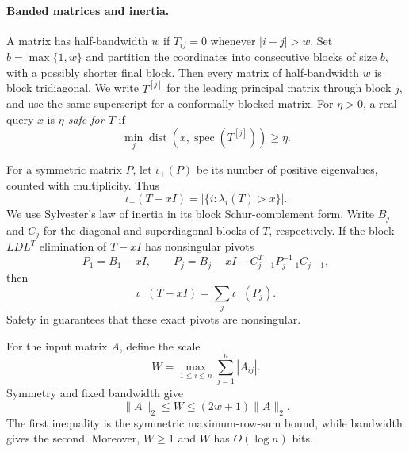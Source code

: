 \documentclass[11pt]{article}
\begin{document}
\paragraph{Banded matrices and inertia.}
A matrix has half-bandwidth $w$ if $T_{ij}=0$ whenever $|i-j|>w$.
Set $b=\max\{1,w\}$ and partition the coordinates into consecutive blocks of
size $b$, with a possibly shorter final block.  Then every matrix of
half-bandwidth $w$ is block tridiagonal.  We write $T^{[j]}$ for the leading
principal matrix through block $j$, and use the same superscript for a
conformally blocked matrix.  For $\eta>0$, a real query $x$ is
\emph{$\eta$-safe for $T$} if
\begin{equation}
 \label{eq:safe-query}
 \min_j\operatorname{dist}(x,\operatorname{spec}(T^{[j]}))\geq\eta.
\end{equation}

For a symmetric matrix $P$, let $\iota_+(P)$ be its number of positive
eigenvalues, counted with multiplicity.  Thus
\begin{equation}
 \label{eq:inertia-count}
 \iota_+(T-xI)=|\{i:\lambda_i(T)>x\}|.
\end{equation}
We use Sylvester's law of inertia in its block Schur-complement form.  Write
$B_j$ and $C_j$ for the diagonal and superdiagonal blocks of $T$,
respectively.  If the block $LDL^T$ elimination of $T-xI$ has nonsingular
pivots
\begin{equation}
 \label{eq:exact-block-pivots}
 P_1=B_1-xI,
 \qquad
 P_j=B_j-xI-C_{j-1}^TP_{j-1}^{-1}C_{j-1},
\end{equation}
then
\begin{equation}
 \label{eq:block-inertia}
 \iota_+(T-xI)=\sum_j\iota_+(P_j).
\end{equation}
Safety in  guarantees that these exact pivots are
nonsingular.

For the input matrix $A$, define the scale
\[
 W=\max_{1\leq i\leq n}\sum_{j=1}^{n}|A_{ij}|.
\]
Symmetry and fixed bandwidth give
\begin{equation}
 \label{eq:W-comparison}
 \lVert A\rVert_2\leq W\leq(2w+1)\lVert A\rVert_2.
\end{equation}
The first inequality is the symmetric maximum-row-sum bound, while bandwidth
gives the second.  Moreover, $W\geq1$ and $W$ has $O(\log n)$ bits.
\end{document}
